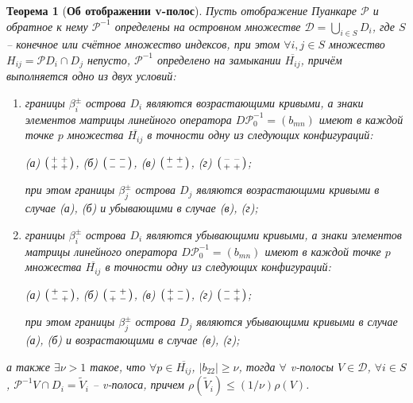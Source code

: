 \documentclass{article}
\newtheorem*{theorem}{Теорема}
\newenvironment{psm}
	{\left( \begin{smallmatrix}}
	{\end{smallmatrix} \right) }
\begin{document}
\begin{theorem}[{\bf Об отображении v-полос}]
Пусть отображение Пуанкаре $\mathcal{P}$ и обратное к нему $\mathcal{P}^{-1}$ определены на островном множестве $\mathcal{D} = \bigcup_{i \in S} D_i$, где $S$ -- конечное или счётное множество индексов, при этом $\forall i, j \in S$ множество $H_{ij} = \mathcal{P} D_i \cap D_j$ непусто, $\mathcal{P}^{-1}$ определено на замыкании $\overline{H_{ij}}$, причём выполняется одно из двух условий:
\begin{enumerate}
	\item границы $\beta_i^{\pm}$ острова $D_i$ являются возрастающими кривыми, а знаки элементов матрицы линейного оператора $D \mathcal{P}_0^{-1} = (b_{mn})$ имеют в каждой точке $p$ множества $\overline{H_{ij}}$ в точности одну из следующих конфигураций:
		\begin{center}
			(а) $\begin{psm} + & + \\ + & + \end{psm}$, \quad
			(б) $\begin{psm} - & - \\ - & - \end{psm}$, \quad
			(в) $\begin{psm} + & + \\ - & - \end{psm}$, \quad
			(г) $\begin{psm} - & - \\ + & + \end{psm}$;
		\end{center}
		при этом границы $\beta_j^{\pm}$ острова $D_j$ являются возрастающими кривыми в случае (а), (б) и убывающими в случае (в), (г);
	\item границы $\beta_i^{\pm}$ острова $D_i$ являются убывающими кривыми, а знаки элементов матрицы линейного оператора $D \mathcal{P}_0^{-1} = (b_{mn})$ имеют в каждой точке $p$ множества $\overline{H_{ij}}$ в точности одну из следующих конфигураций:
		\begin{center}
			 (а) $\begin{psm} + & - \\ - & + \end{psm}$, \quad
			 (б) $\begin{psm} - & + \\ + & - \end{psm}$, \quad
			 (в) $\begin{psm} + & - \\ + & - \end{psm}$, \quad
			 (г) $\begin{psm} - & + \\ - & + \end{psm}$;
		\end{center}
		при этом границы $\beta_j^{\pm}$ острова $D_j$ являются убывающими кривыми в случае (а), (б) и возрастающими в случае (в), (г);
\end{enumerate}
а также $\exists \nu > 1$ такое, что $\forall p \in \overline{H_{ij}}$, $|b_{22}| \ge \nu$, тогда $\forall$ v-полосы $V \in \mathcal{D}$, $\forall i \in S$, $\mathcal{P}^{-1} V \cap D_i = \widetilde{V}_i$ -- v-полоса, причем $\rho(\widetilde{V}_i) \le (1 / \nu) \rho(V)$.


\end{theorem}
\end{document}
